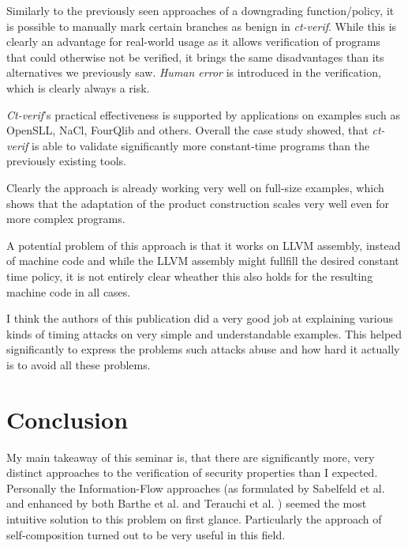 \documentclass[a4paper,UKenglish]{lipics-v2018}
\begin{document}
Similarly to the previously seen approaches of a downgrading function/policy, it is possible to manually mark certain branches as benign in \textit{ct-verif}. While this is clearly an advantage for real-world usage as it allows verification of programs that could otherwise not be verified, it brings the same disadvantages than its alternatives we previously saw. \textit{Human error} is introduced in the verification, which is clearly always a risk.

\textit{Ct-verif}'s practical effectiveness is supported by applications on examples such as OpenSLL, NaCl, FourQlib and others. Overall the case study showed, that \textit{ct-verif} is able to validate significantly more constant-time programs than the previously existing tools.
\cite{verifying_constant_time_implementations}

Clearly the approach is already working very well on full-size examples, which shows that the adaptation of the product construction scales very well even for more complex programs.
\cite{verifying_constant_time_implementations}

A potential problem of this approach is that it works on LLVM assembly, instead of machine code and while the LLVM assembly might fullfill the desired constant time policy, it is not entirely clear wheather this also holds for the resulting machine code in all cases.\cite{verifying_constant_time_implementations}

I think the authors of this publication did a very good job at explaining various kinds of timing attacks on very simple and understandable examples. This helped significantly to express the problems such attacks abuse and how hard it actually is to avoid all these problems.



\section{Conclusion}

My main takeaway of this seminar is, that there are significantly more, very distinct approaches to the verification of security properties than I expected. Personally the Information-Flow approaches (as formulated by Sabelfeld et al.\cite{language_based_information_flow_security} and enhanced by both Barthe et al.\cite{information_flow_by_self_composition} and Terauchi et al. \cite{secure_information_flow_safety}) seemed the most intuitive solution to this problem on first glance. Particularly the approach of self-composition turned out to be very useful in this field.
\end{document}
